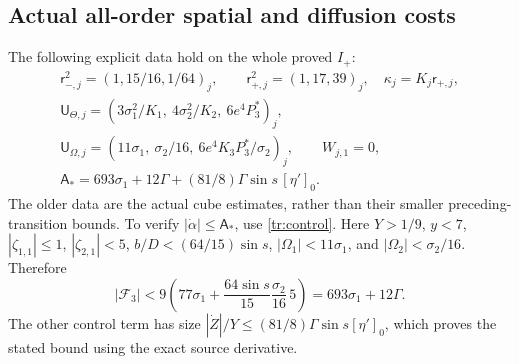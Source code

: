 \subsection{Actual all-order spatial and diffusion costs}

The following explicit data hold on the whole proved $I_+$:
\begin{equation}\label{trls:normdata}
 \begin{gathered}
 \mathsf r_{-,j}^2=(1,15/16,1/64)_j,\qquad
 \mathsf r_{+,j}^2=(1,17,39)_j,\quad
 \mathsf\kappa_j=K_j\mathsf r_{+,j},\\
 \mathsf U_{\Theta,j}=
 (3\sigma_1^2/K_1,\ 4\sigma_2^2/K_2,\ 6e^4P_3^*)_j,\\
 \mathsf U_{\Omega,j}=
 (11\sigma_1,\ \sigma_2/16,\ 6e^4K_3P_3^*/\sigma_2)_j,
 \qquad W_{j,1}=0,\\
 \mathsf A_*=693\sigma_1+12\Gamma
           +(81/8)\Gamma\sin s\,[\eta']_0.
 \end{gathered}
\end{equation}
The older data are the actual cube estimates, rather than their
smaller preceding-transition bounds. To verify
$|\dot\alpha|\leq\mathsf A_*$, use \eqref{tr:control}.
Here $Y>1/9$, $y<7$, $|\zeta_{1,1}|\leq1$,
$|\zeta_{2,1}|<5$, $b/D<(64/15)\sin s$,
$|\Omega_1|<11\sigma_1$, and
$|\Omega_2|<\sigma_2/16$. Therefore
\[
 |\mathcal F_3|
 <9\left(77\sigma_1+
   \frac{64\sin s}{15}\frac{\sigma_2}{16}\,5\right)
 =693\sigma_1+12\Gamma.
\]
The other control term has size
$|\dot Z|/Y\leq(81/8)\Gamma\sin s[\eta']_0$,
which proves the stated bound using the exact source derivative.


